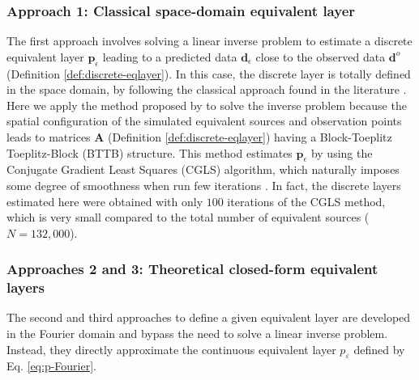 \subsubsection{Approach 1: Classical space-domain equivalent layer}

The first approach involves solving a linear inverse problem to estimate a discrete 
equivalent layer $\mathbf{p}_{\epsilon}$ leading to a predicted data $\mathbf{d}_{\epsilon}$ 
close to the observed data $\mathbf{d}^{o}$ (Definition \ref{def:discrete-eqlayer}).
In this case, the discrete layer is totally defined in the space domain, by following the 
classical approach found in the literature \citep[e.g.,][]{oliveirajr_etal2023}.
Here we apply the method proposed by \cite{takahashi-etal2020, takahashi-etal2022} 
to solve the inverse problem because the spatial configuration of the 
simulated equivalent sources and observation points leads to 
matrices $\mathbf{A}$ (Definition \ref{def:discrete-eqlayer}) having a Block-Toeplitz 
Toeplitz-Block (BTTB) structure.
This method estimates $\mathbf{p}_{\epsilon}$ by using the Conjugate Gradient Least Squares 
(CGLS) algorithm, which naturally imposes some degree of smoothness when run few iterations 
\citep[][p. 166]{aster_etal2019}.
In fact, the discrete layers estimated here were obtained with only $100$ iterations of the 
CGLS method, which is very small compared to the total number of equivalent sources 
($N = 132,000$).

\subsubsection{Approaches 2 and 3: Theoretical closed-form equivalent layers}

The second and third approaches to define a given equivalent layer are developed in the Fourier domain 
and bypass the need to solve a linear inverse problem. Instead, they directly approximate the continuous 
equivalent layer $p_{\varepsilon}$ defined by Eq. \ref{eq:p-Fourier}. 

